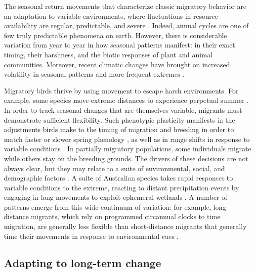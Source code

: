 \documentclass[a4paper, nobind]{templates/ociamthesis}
\begin{document}
The seasonal return movements that characterize classic migratory behavior are an adaptation to variable environments, where fluctuations in resource availability are regular, predictable, and severe \autocite{wingerLongWinterRed2019}. Indeed, annual cycles are one of few truly predictable phenomena on earth. However, there is considerable variation from year to year in how seasonal patterns manifest: in their exact timing, their harshness, and the biotic responses of plant and animal communities. Moreover, recent climatic changes have brought on increased volatility in seasonal patterns and more frequent extremes \autocite{ipccClimateChange20142014}.

Migratory birds thrive by using movement to escape harsh environments. For example, some species move extreme distances to experience perpetual summer \autocite{shafferMigratoryShearwatersIntegrate2006,newtonMigrationEcologyBirds2008}. In order to track seasonal changes that are themselves variable, migrants must demonstrate sufficient flexibility. Such phenotypic plasticity manifests in the adjustments birds make to the timing of migration and breeding in order to match faster or slower spring phenology \autocite{charmantierAdaptivePhenotypicPlasticity2008,charmantierClimateChangeTiming2014,usuiTemporalShiftsTemperature2017,hortonPhenologyNocturnalAvian2020}, as well as in range shifts in response to variable conditions \autocite[e.g.~][]{batemanImportanceRangeEdges2015}. In partially migratory populations, some individuals migrate while others stay on the breeding grounds. The drivers of these decisions are not always clear, but they may relate to a suite of environmental, social, and demographic factors \autocite{chapmanEcologyEvolutionPartial2011}. A suite of Australian species takes rapid responses to variable conditions to the extreme, reacting to distant precipitation events by engaging in long movements to exploit ephemeral wetlands \autocite{pedlerLongdistanceFlightsHighrisk2018}. A number of patterns emerge from this wide continuum of variation: for example, long-distance migrants, which rely on programmed circannual clocks to time migration, are generally less flexible than short-distance migrants that generally time their movements in response to environmental cues \autocite{newtonMigrationEcologyBirds2008}.

\hypertarget{adapting-to-long-term-change}{%
\subsection*{Adapting to long-term change}\label{adapting-to-long-term-change}}
\end{document}

